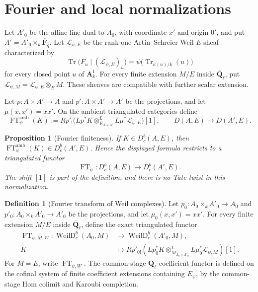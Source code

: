 \documentclass[10pt]{article}
\newtheorem{proposition}[theorem]{Proposition}
\theoremstyle{definition}
\newtheorem{definition}[theorem]{Definition}
\newcommand{\Fbar}{\overline{\mathbf F}_q}
\newcommand{\Qlb}{\overline{\mathbf Q}_\ell}
\newcommand{\Aone}{\mathbf A^1}
\newcommand{\Tr}{\operatorname{Tr}}
\newcommand{\FT}{\operatorname{FT}}
\begin{document}
\section{Fourier and local normalizations}

Let \(A'_0\) be the affine line dual to \(A_0\), with coordinate \(x'\) and
origin \(0'\), and put \(A'=A'_0\times_k\Fbar\).  Let
\(\mathcal L_{\psi,E}\) be the rank-one Artin--Schreier Weil \(E\)-sheaf
characterized by
\[
  \Tr\bigl(F_u\mid(\mathcal L_{\psi,E})_{\bar u}\bigr)
  =\psi\bigl(\Tr_{\kappa(u)/k}(u)\bigr)
\]
for every closed point \(u\) of \(\Aone_k\).
For every finite extension \(M/E\) inside \(\Qlb\), put
\(\mathcal L_{\psi,M}=\mathcal L_{\psi,E}\otimes_E M\).  These sheaves are
compatible with further scalar extension.

Let \(p:A\times A'\to A\) and \(p':A\times A'\to A'\) be the projections,
and let \(\mu(x,x')=xx'\).  On the ambient triangulated categories define
\[
  \FT_\psi^{\mathrm{amb}}(K)
  :=Rp'_!\bigl(Lp^*K
       \otimes^L_{E_{A\times A'}}L\mu^*\mathcal L_{\psi,E}\bigr)[1],
  \qquad
  D(A,E)\longrightarrow D(A',E).
\]

\begin{proposition}[Fourier finiteness]
If \(K\in D^b_c(A,E)\), then
\(\FT_\psi^{\mathrm{amb}}(K)\in D^b_c(A',E)\).  Hence the displayed formula
restricts to a triangulated functor
\[
  \FT_\psi:D^b_c(A,E)\longrightarrow D^b_c(A',E).
\]
The shift \([1]\) is part of the definition, and there is no Tate twist in
this normalization.
\end{proposition}

\begin{definition}[Fourier transform of Weil complexes]
Let \(p_0:A_0\times_kA'_0\to A_0\) and
\(p'_0:A_0\times_kA'_0\to A'_0\) be the projections, and let
\(\mu_0(x,x')=xx'\).  For every finite extension \(M/E\) inside
\(\Qlb\), define the exact triangulated functor
\[
 \begin{aligned}
 \FT_{\psi,M,W}:\operatorname{WeilD}^b_c(A_0,M)
   &\longrightarrow\operatorname{WeilD}^b_c(A'_0,M),\\
 K&\longmapsto Rp'_{0!}\left(
     Lp_0^*K\otimes^L_{M_{A_0\times A'_0}}
     L\mu_0^*\mathcal L_{\psi,M}\right)[1].
 \end{aligned}
\]
For \(M=E\), write \(\FT_{\psi,W}\).  The common-stage
\(\Qlb\)-coefficient functor is defined on the cofinal system of finite
coefficient extensions containing \(E_\psi\), by the common-stage Hom
colimit and Karoubi completion.
\end{definition}
\end{document}
